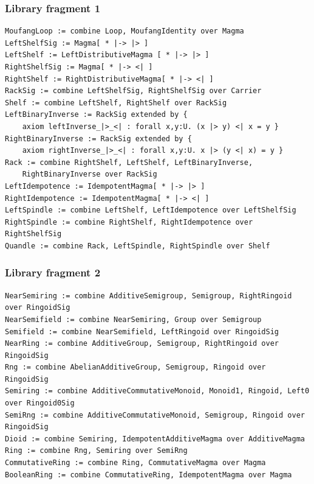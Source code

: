 \documentclass{beamer}
\begin{document}
\lstset{language=mathscheme,basicstyle=\scriptsize}
\begin{frame}[t,fragile]
\frametitle{Library fragment 1}
\begin{lstlisting}
MoufangLoop := combine Loop, MoufangIdentity over Magma
LeftShelfSig := Magma[ * |-> |> ]
LeftShelf := LeftDistributiveMagma [ * |-> |> ]
RightShelfSig := Magma[ * |-> <| ]
RightShelf := RightDistributiveMagma[ * |-> <| ]
RackSig := combine LeftShelfSig, RightShelfSig over Carrier
Shelf := combine LeftShelf, RightShelf over RackSig
LeftBinaryInverse := RackSig extended by {
    axiom leftInverse_|>_<| : forall x,y:U. (x |> y) <| x = y }
RightBinaryInverse := RackSig extended by {
    axiom rightInverse_|>_<| : forall x,y:U. x |> (y <| x) = y }
Rack := combine RightShelf, LeftShelf, LeftBinaryInverse, 
    RightBinaryInverse over RackSig
LeftIdempotence := IdempotentMagma[ * |-> |> ]
RightIdempotence := IdempotentMagma[ * |-> <| ]
LeftSpindle := combine LeftShelf, LeftIdempotence over LeftShelfSig
RightSpindle := combine RightShelf, RightIdempotence over RightShelfSig
Quandle := combine Rack, LeftSpindle, RightSpindle over Shelf
\end{lstlisting}
\end{frame}

\begin{frame}[t,fragile]
\frametitle{Library fragment 2}
\begin{lstlisting}
NearSemiring := combine AdditiveSemigroup, Semigroup, RightRingoid over RingoidSig
NearSemifield := combine NearSemiring, Group over Semigroup
Semifield := combine NearSemifield, LeftRingoid over RingoidSig
NearRing := combine AdditiveGroup, Semigroup, RightRingoid over RingoidSig
Rng := combine AbelianAdditiveGroup, Semigroup, Ringoid over RingoidSig
Semiring := combine AdditiveCommutativeMonoid, Monoid1, Ringoid, Left0 over Ringoid0Sig
SemiRng := combine AdditiveCommutativeMonoid, Semigroup, Ringoid over RingoidSig
Dioid := combine Semiring, IdempotentAdditiveMagma over AdditiveMagma
Ring := combine Rng, Semiring over SemiRng
CommutativeRing := combine Ring, CommutativeMagma over Magma
BooleanRing := combine CommutativeRing, IdempotentMagma over Magma
\end{lstlisting}
\end{frame}
\end{document}
